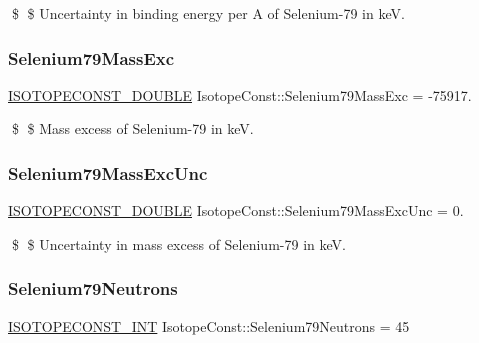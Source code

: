 \$ \$ Uncertainty in binding energy per A of Selenium-\/79 in keV. \mbox{\label{group___isotope_const-_selenium-_se79_gaecb3913d340bd2792f52a3fb491c5338}} 
\subsubsection{\texorpdfstring{Selenium79\+Mass\+Exc}{Selenium79MassExc}}
{\footnotesize\ttfamily \mbox{\hyperlink{group___isotope_const-_macros_ga8f45a7272ce02c0b4c65c44636ed719a}{I\+S\+O\+T\+O\+P\+E\+C\+O\+N\+S\+T\+\_\+\+D\+O\+U\+B\+LE}} Isotope\+Const\+::\+Selenium79\+Mass\+Exc = -\/75917.}

\$ \$ Mass excess of Selenium-\/79 in keV. \mbox{\label{group___isotope_const-_selenium-_se79_gaaece43a67be44ca6fa4d640f7401e259}} 
\subsubsection{\texorpdfstring{Selenium79\+Mass\+Exc\+Unc}{Selenium79MassExcUnc}}
{\footnotesize\ttfamily \mbox{\hyperlink{group___isotope_const-_macros_ga8f45a7272ce02c0b4c65c44636ed719a}{I\+S\+O\+T\+O\+P\+E\+C\+O\+N\+S\+T\+\_\+\+D\+O\+U\+B\+LE}} Isotope\+Const\+::\+Selenium79\+Mass\+Exc\+Unc = 0.}

\$ \$ Uncertainty in mass excess of Selenium-\/79 in keV. \mbox{\label{group___isotope_const-_selenium-_se79_ga8207b723734dcbbeea2bebcfa750ccce}} 
\subsubsection{\texorpdfstring{Selenium79\+Neutrons}{Selenium79Neutrons}}
{\footnotesize\ttfamily \mbox{\hyperlink{group___isotope_const-_macros_ga5f18360b3e99483a35c32d789e62621c}{I\+S\+O\+T\+O\+P\+E\+C\+O\+N\+S\+T\+\_\+\+I\+NT}} Isotope\+Const\+::\+Selenium79\+Neutrons = 45}

